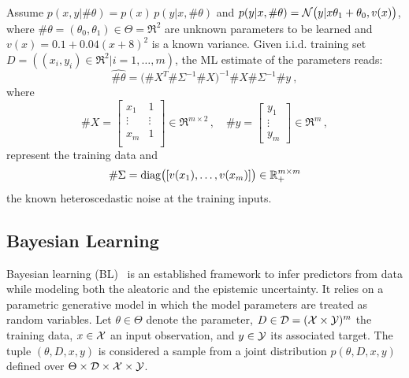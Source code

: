 \begin{example}Assume $p(x,y|\#\theta)=p(x)\,p(y|x,\#\theta)$
and $p(y|x,\#\theta)=\SN\big (y|x\theta_1+\theta_0,v(x)\big )$, where $\#\theta=(\theta_0,\theta_1)\in\Theta=\Re^2$ are unknown parameters to be learned and $v(x)=0.1 + 0.04(x + 8)^2$ is a known variance.  Given i.i.d. training set $D=((x_i,y_i)\in\Re^2|i=1,\ldots,m)$, the ML estimate of the parameters reads:
\[
   \hat{\#\theta}= \big (\#X^T\#\Sigma^{-1}\#X\big )^{-1} \#X\#\Sigma^{-1}\#y \:,
\]
%
where 
\begin{equation}
\label{equ:DataXy}
\#X=\left [ \begin{array}{cc}x_1& 1\\ \vdots&\vdots \\ x_m&1\\ \end{array}\right]\in\Re^{m\times 2}\,, \quad\#y=\left [ \begin{array}{c} y_1\\ \vdots \\ y_m \end{array}\right ]\in\Re^{m}\,, 
\end{equation}
%
represent the training data and 
\begin{equation}\label{equ:DataNoise}
\#\Sigma = {\rm diag}\big( [v(x_1),\ldots,v(x_m)]\big )\in\Re_{+}^{m\times m}
\end{equation}
%
the known heteroscedastic noise at the training inputs.

\end{example}


\subsection{Bayesian Learning}

Bayesian learning (BL)~\cite{Bishop-PRML-2006,Gelman-Bayesian-2013} is an established framework to infer predictors from data while modeling both the aleatoric and the epistemic uncertainty. It relies on a parametric generative model in which the model parameters are treated as random variables. Let $\theta \in \Theta$ denote the parameter, $D \in \SD = (\SX \times \SY)^m$ the training data, $x \in \SX$ an input observation, and $y \in \SY$ its associated target. The tuple $(\theta,D,x,y)$ is considered a sample from a joint distribution $p(\theta,D,x,y)$ defined over $\Theta\times\SD\times\SX\times\SY$. 

